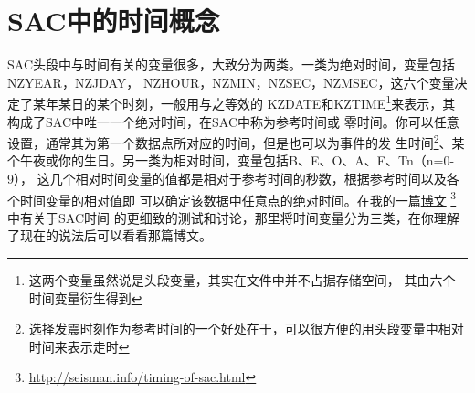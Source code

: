 \section{SAC中的时间概念}
SAC头段中与时间有关的变量很多，大致分为两类。一类为绝对时间，变量包括NZYEAR，NZJDAY，
NZHOUR，NZMIN，NZSEC，NZMSEC，这六个变量决定了某年某日的某个时刻，一般用与之等效的
KZDATE和KZTIME\footnote{这两个变量虽然说是头段变量，其实在文件中并不占据存储空间，
其由六个时间变量衍生得到}来表示，其构成了SAC中唯一一个绝对时间，在SAC中称为参考时间或
零时间。你可以任意设置，通常其为第一个数据点所对应的时间，但是也可以为事件的发
生时间\footnote{选择发震时刻作为参考时间的一个好处在于，可以很方便的用头段变量中相对
时间来表示走时}、某个午夜或你的生日。另一类为相对时间，变量包括B、E、O、A、F、Tn（n=0-9），
这几个相对时间变量的值都是相对于参考时间的秒数，根据参考时间以及各个时间变量的相对值即
可以确定该数据中任意点的绝对时间。在我的一篇\href{http://seisman.info/timing-of-sac.html}{博文}
\footnote{\url{http://seisman.info/timing-of-sac.html}}中有关于SAC时间
的更细致的测试和讨论，那里将时间变量分为三类，在你理解了现在的说法后可以看看那篇博文。

